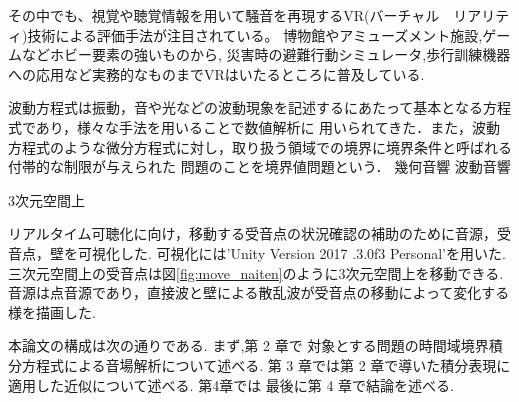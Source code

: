 \documentclass[dvipdfmx]{ampbt}
\begin{document}
その中でも、視覚や聴覚情報を用いて騒音を再現するVR(バーチャル　リアリティ)技術による評価手法が注目されている。
博物館やアミューズメント施設,ゲームなどホビー要素の強いものから,
災害時の避難行動シミュレータ\cite{vrsaigai},歩行訓練機器への応用\cite{vrmedical}など実務的なものまでVRはいたるところに普及している.\par

波動方程式は振動，音や光などの波動現象を記述するにあたって基本となる方程式であり，様々な手法を用いることで数値解析に
用いられてきた．また，波動方程式のような微分方程式に対し，取り扱う領域での境界に境界条件と呼ばれる付帯的な制限が与えられた
問題のことを境界値問題という．
幾何音響
波動音響

3次元空間上




リアルタイム可聴化に向け，移動する受音点の状況確認の補助のために音源，受音点，壁を可視化した.
可視化には'Unity Version 2017 .3.0f3 Personal'を用いた.
三次元空間上の受音点は図\ref{fig:move_naiten}のように3次元空間上を移動できる.
音源は点音源であり，直接波と壁による散乱波が受音点の移動によって変化する様を描画した.



本論文の構成は次の通りである.
 まず,第 2 章で 対象とする問題の時間域境界積分方程式による音場解析について述べる.
 第 3 章では第 2 章で導いた積分表現に適用した近似について述べる.
第4章では
 最後に第 4 章で結論を述べる.


%
\end{document}
